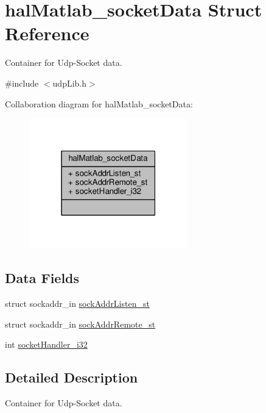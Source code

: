\hypertarget{structhalMatlab__socketData}{\section{hal\+Matlab\+\_\+socket\+Data Struct Reference}
\label{structhalMatlab__socketData}
}


Container for Udp-\/\+Socket data.  




{\ttfamily \#include $<$udp\+Lib.\+h$>$}



Collaboration diagram for hal\+Matlab\+\_\+socket\+Data\+:
\nopagebreak
\begin{figure}[H]
\begin{center}
\leavevmode
\includegraphics[width=195pt]{structhalMatlab__socketData__coll__graph}
\end{center}
\end{figure}
\subsection*{Data Fields}
\begin{DoxyCompactItemize}
\item 
struct sockaddr\+\_\+in \hyperlink{structhalMatlab__socketData_a879fc935cde2c09c6c02cf6e6ecafb86_a879fc935cde2c09c6c02cf6e6ecafb86}{sock\+Addr\+Listen\+\_\+st}
\item 
struct sockaddr\+\_\+in \hyperlink{structhalMatlab__socketData_aa9b77c362396cf1fbb78dd9688da4a0d_aa9b77c362396cf1fbb78dd9688da4a0d}{sock\+Addr\+Remote\+\_\+st}
\item 
int \hyperlink{structhalMatlab__socketData_a60bb1e30d40ee435f1f9501933aba991_a60bb1e30d40ee435f1f9501933aba991}{socket\+Handler\+\_\+i32}
\end{DoxyCompactItemize}


\subsection{Detailed Description}
Container for Udp-\/\+Socket data. 



